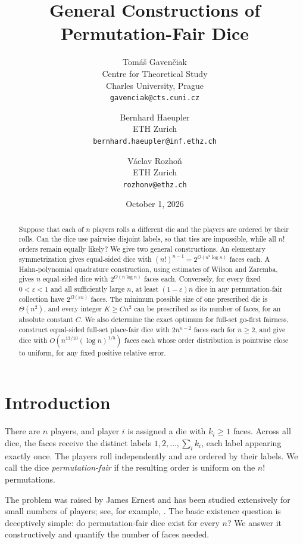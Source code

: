 \documentclass[11pt]{article}
\title{General Constructions of Permutation-Fair Dice}
\author{%
  Tom\'a\v{s} Gaven\v{c}iak\\
  \small Centre for Theoretical Study\\[-1mm]
  \small Charles University, Prague\\[-1mm]
  \small\texttt{gavenciak@cts.cuni.cz}
  \and
  Bernhard Haeupler\\
  \small ETH Zurich\\[-1mm]
  \small\texttt{bernhard.haeupler@inf.ethz.ch}
  \and
  V\'aclav Rozho\v{n}\\
  \small ETH Zurich\\[-1mm]
  \small\texttt{rozhonv@ethz.ch}}
\date{October 1, 2026}
\theoremstyle{definition}
\theoremstyle{remark}
\begin{document}
\maketitle

\begin{abstract}
Suppose that each of \(n\) players rolls a different die and the players are
ordered by their rolls.  Can the dice use pairwise disjoint labels, so that
ties are impossible, while all \(n!\) orders remain equally likely?  We give
two general constructions.  An elementary symmetrization gives equal-sided
dice with \((n!)^{n-1}=2^{O(n^2\log n)}\) faces each.  A Hahn-polynomial quadrature
construction, using estimates of Wilson and Zaremba, gives \(n\) equal-sided
dice with \(2^{O(n\log n)}\) faces each.  Conversely, for every fixed
\(0<\varepsilon<1\) and all sufficiently large \(n\), at least
\((1-\varepsilon)n\) dice in any permutation-fair collection have
\(2^{\Omega(\varepsilon n)}\) faces.  The minimum possible size of one
prescribed die is \(\Theta(n^2)\), and every integer \(K\geq Cn^2\) can
be prescribed as its number of faces, for an absolute constant \(C\).
We also determine the exact
optimum for full-set go-first fairness, construct equal-sided full-set
place-fair dice with \(2n^{n-2}\) faces each for \(n\geq2\), and give
dice with \(O(n^{13/10}(\log n)^{1/5})\) faces each whose order distribution
is pointwise close to uniform, for any fixed positive relative error.
\end{abstract}

\section{Introduction}

There are \(n\) players, and player \(i\) is assigned a die with
\(k_i\geq1\) faces.  Across all dice, the faces receive the distinct labels
\(1,2,\ldots,\sum_i k_i\), each label appearing exactly once.  The players
roll independently and are ordered by their labels.  We call the dice
\emph{permutation-fair} if the resulting order is uniform on the \(n!\)
permutations.

The problem was raised by James Ernest and has been studied extensively for
small numbers of players; see, for example,
\cite{harshbarger-web,harshbarger2012,ford2023,purcell}.  The basic existence
question is deceptively simple: do permutation-fair dice exist for every
\(n\)?  We answer it constructively and quantify the number of faces needed.
\end{document}
